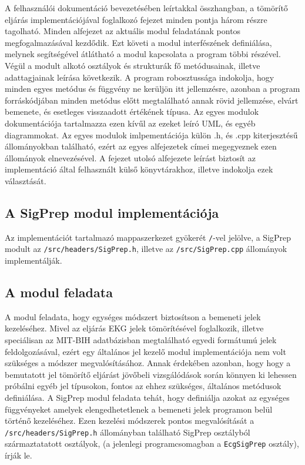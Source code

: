 \documentclass[oneside,titlepage,12pt,a4paper]{report}
\begin{document}
A felhasználói dokumentáció bevezetésében leírtakkal összhangban, a tömörítő eljárás implementációjával foglalkozó fejezet minden pontja három részre tagolható. Minden alfejezet az aktuális modul feladatának pontos megfogalmazásával kezdődik. Ezt követi a modul interfészének definiálása, melynek segítségével átlátható a modul kapcsolata a program többi részével. Végül a modult alkotó osztályok és strukturák fő metódusainak, illetve adattagjainak leírása következik. A program robosztussága indokolja, hogy minden egyes metódus és függvény ne kerüljön itt jellemzésre, azonban a program forráskódjában minden metódus előtt megtalálható annak rövid jellemzése, elvárt bemenete, és esetleges visszaadott értékének típusa. Az egyes modulok dokumentációja tartalmazza ezen kívűl az ezeket leíró UML, és egyéb diagrammokat. Az egyes modulok imlpementációja külön .h, és .cpp kiterjesztésű állományokban található, ezért az egyes alfejezetek címei megegyeznek ezen állományok elnevezésével. A fejezet utolsó alfejezete leírást biztosít az implementáció által felhasznált külső könyvtárakhoz, illetve indokolja ezek választását.

\subsection{A SigPrep modul implementációja}

Az implementációt tartalmazó mappaszerkezet gyökerét \texttt{/}-vel jelölve, a SigPrep modult  az \texttt{/src/headers/SigPrep.h}, illetve az \texttt{/src/SigPrep.cpp} állományok implementálják. 

\subsection*{A modul feladata}

\par A modul feladata, hogy egységes módszert biztosítson a bemeneti jelek kezeléséhez. 
Mivel az eljárás EKG jelek tömörítésével foglalkozik, illetve speciálisan az MIT-BIH adatbázisban megtalálható egyedi formátumú jelek feldolgozásával, 
ezért egy általános jel kezelő modul implementációja nem volt szükséges a módszer megvalósításához. Annak érdekében azonban, hogy 
hogy a bemutatott jel tömörítő eljárást jövőbeli vizsgálódások során könnyen ki lehessen próbálni egyéb jel típusokon, fontos az ehhez szükséges, általános metódusok definiálása. A SigPrep modul feladata tehát, hogy definiálja azokat az egységes függvényeket amelyek elengedhetetlenek a bemeneti jelek programon belül történő kezeléséhez. Ezen kezelési módszerek pontos megvalósítását a \texttt{/src/headers/SigPrep.h} állományban található SigPrep osztályból származtatatott osztályok, (a jelenlegi programcsomagban a \texttt{EcgSigPrep} osztály), írják le. 
\end{document}
